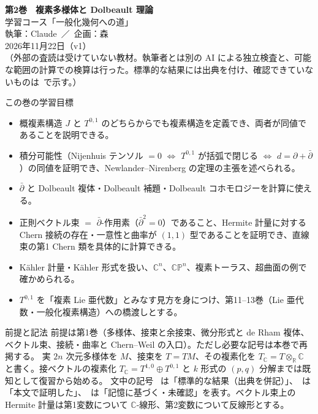 
\usepackage{tikz}
\usepackage{tikz-cd}
\usetikzlibrary{arrows.meta,positioning}
\newcommand{\Tc}{T_{\mathbb C}}
\newcommand{\Oc}{\mathcal O}
\newcommand{\CP}{\mathbb{CP}}
\newcommand{\Lam}{\Lambda}
\newcommand{\A}{\mathcal A}
\newcommand{\ip}[2]{\langle #1,#2\rangle}
\newcommand{\Ric}{\mathrm{Ric}}
\newcommand{\pr}{\mathrm{pr}}
\newcommand{\tr}{\mathrm{tr}}
\newcommand{\vol}{\mathrm{vol}}
\renewcommand{\Re}{\operatorname{Re}}
\renewcommand{\Im}{\operatorname{Im}}

\sloppy
\begin{center}
{\LARGE\bfseries\sffamily 第2巻　複素多様体と Dolbeault 理論}\\[8pt]
{\large 学習コース「一般化幾何への道」}\\[6pt]
{\large 執筆：Claude\ ／\ 企画：森}\\[3pt]
2026年11月22日（v1）\\[3pt]
{\small （外部の査読は受けていない教材。執筆者とは別の AI による独立検査と、可能な範囲の計算での検算は行った。標準的な結果には出典を付け、確認できていないものは\tQ\ で示す。）}
\end{center}

\begin{goalbox}{この巻の学習目標}
\begin{itemize}
\item 概複素構造 $J$ と $T^{0,1}$ のどちらからでも複素構造を定義でき、両者が同値であることを説明できる。
\item 積分可能性（Nijenhuis テンソル $=0$ $\Leftrightarrow$ $T^{0,1}$ が括弧で閉じる $\Leftrightarrow$ $d=\partial+\bar\partial$）の同値を証明でき、Newlander--Nirenberg の定理の主張を述べられる。
\item $\bar\partial$ と Dolbeault 複体・Dolbeault 補題・Dolbeault コホモロジーを計算に使える。
\item 正則ベクトル束 $=$ $\bar\partial$-作用素（$\bar\partial^2=0$）であること、Hermite 計量に対する Chern 接続の存在・一意性と曲率が $(1,1)$ 型であることを証明でき、直線束の第1 Chern 類を具体的に計算できる。
\item Kähler 計量・Kähler 形式を扱い、$\mathbb C^n$、$\mathbb{CP}^n$、複素トーラス、超曲面の例で確かめられる。
\item $T^{0,1}$ を「複素 Lie 亜代数」とみなす見方を身につけ、第11--13巻（Lie 亜代数・一般化複素構造）への橋渡しとする。
\end{itemize}
\end{goalbox}
\begin{goalbox}{前提と記法}
前提は第1巻（多様体、接束と余接束、微分形式と de Rham 複体、ベクトル束、接続・曲率と Chern--Weil の入口）。ただし必要な記号は本巻で再掲する。
実 $2n$ 次元多様体を $M$、接束を $T=TM$、その複素化を $\Tc=T\otimes_{\mathbb R}\mathbb C$ と書く。接ベクトルの複素化 $\Tc=T^{1,0}\oplus T^{0,1}$ と $k$ 形式の $(p,q)$ 分解までは既知として復習から始める。
文中の記号 \tC\ は「標準的な結果（出典を併記）」、\tP\ は「本文で証明した」、\tQ\ は「記憶に基づく・未確認」を表す。ベクトル束上の Hermite 計量は第1変数について $\mathbb C$-線形、第2変数について反線形とする。
\end{goalbox}
\tableofcontents
\newpage

